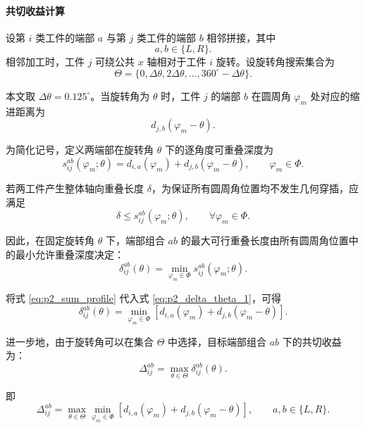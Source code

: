\documentclass[UTF8]{ctexart}
\begin{document}
\paragraph{共切收益计算}

设第 $i$ 类工件的端部 $a$ 与第 $j$ 类工件的端部 $b$ 相邻拼接，其中
\[
a,b\in\{L,R\}.
\]
相邻加工时，工件 $j$ 可绕公共 $x$ 轴相对于工件 $i$ 旋转。设旋转角搜索集合为
\begin{equation}
\Theta=\{0,\Delta\theta,2\Delta\theta,\ldots,360^\circ-\Delta\theta\}.
\label{eq:p2_theta_grid}
\end{equation}

本文取 $\Delta\theta=0.125^\circ$。当旋转角为 $\theta$ 时，工件 $j$ 的端部 $b$ 在圆周角 $\varphi_m$ 处对应的缩进距离为
\[
d_{j,b}(\varphi_m-\theta).
\]

为简化记号，定义两端部在旋转角 $\theta$ 下的逐角度可重叠深度为
\begin{equation}
s_{ij}^{ab}(\varphi_m;\theta)
=
d_{i,a}(\varphi_m)+d_{j,b}(\varphi_m-\theta),
\qquad \varphi_m\in\Phi.
\label{eq:p2_sum_profile}
\end{equation}

若两工件产生整体轴向重叠长度 $\delta$，为保证所有圆周角位置均不发生几何穿插，应满足
\begin{equation}
\delta\leq s_{ij}^{ab}(\varphi_m;\theta),
\qquad \forall \varphi_m\in\Phi.
\label{eq:p2_overlap_constraint}
\end{equation}

因此，在固定旋转角 $\theta$ 下，端部组合 $ab$ 的最大可行重叠长度由所有圆周角位置中的最小允许重叠深度决定：
\begin{equation}
\delta_{ij}^{ab}(\theta)
=
\min_{\varphi_m\in\Phi}
s_{ij}^{ab}(\varphi_m;\theta).
\label{eq:p2_delta_theta_1}
\end{equation}

将式 \eqref{eq:p2_sum_profile} 代入式 \eqref{eq:p2_delta_theta_1}，可得
\begin{equation}
\delta_{ij}^{ab}(\theta)=
\min_{\varphi_m\in\Phi}
\left[
d_{i,a}(\varphi_m)+d_{j,b}(\varphi_m-\theta)
\right].
\label{eq:p2_delta_theta}
\end{equation}

进一步地，由于旋转角可以在集合 $\Theta$ 中选择，目标端部组合 $ab$ 下的共切收益为：
\begin{equation}
\Delta_{ij}^{ab}
=
\max_{\theta\in\Theta}
\delta_{ij}^{ab}(\theta).
\label{eq:p2_delta_ab_1}
\end{equation}

即
\begin{equation}
\Delta_{ij}^{ab}
=
\max_{\theta\in\Theta}
\min_{\varphi_m\in\Phi}
\left[
d_{i,a}(\varphi_m)+d_{j,b}(\varphi_m-\theta)
\right],
\qquad a,b\in\{L,R\}.
\label{eq:p2_delta_ab}
\end{equation}
\end{document}
